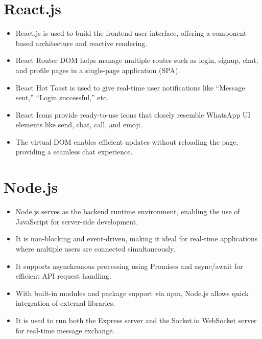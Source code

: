 \documentclass[12pt,a4paper]{report}
\begin{document}
\section{React.js}
\begin{itemize}
    \item React.js is used to build the frontend user interface, offering a component-based architecture and reactive rendering.
    \item React Router DOM helps manage multiple routes such as login, signup, chat, and profile pages in a single-page application (SPA).
    \item React Hot Toast is used to give real-time user notifications like “Message sent,” “Login successful,” etc.
    \item React Icons provide ready-to-use icons that closely resemble WhatsApp UI elements like send, chat, call, and emoji.
    \item The virtual DOM enables efficient updates without reloading the page, providing a seamless chat experience.
\end{itemize}

\section{Node.js}
\begin{itemize}
    \item Node.js serves as the backend runtime environment, enabling the use of JavaScript for server-side development.
    \item It is non-blocking and event-driven, making it ideal for real-time applications where multiple users are connected simultaneously.
    \item It supports asynchronous processing using Promises and async/await for efficient API request handling.
    \item With built-in modules and package support via npm, Node.js allows quick integration of external libraries.
    \item It is used to run both the Express server and the Socket.io WebSocket server for real-time message exchange.
\end{itemize}
\end{document}
